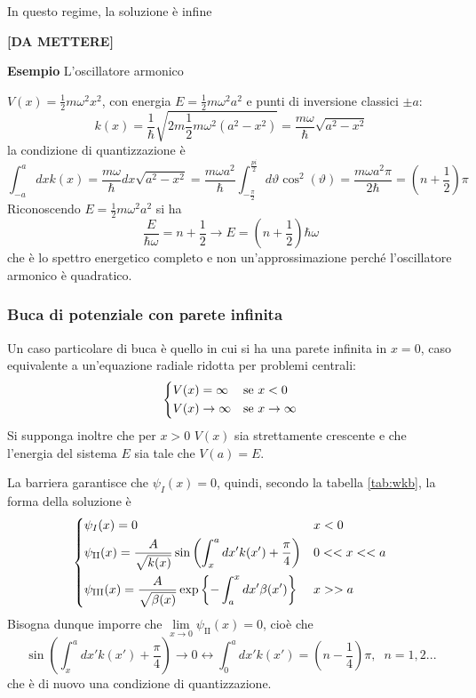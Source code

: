 In questo regime, la soluzione è infine

\begin{center}
{\Large
\textbf{[DA METTERE]}%
}
\end{center}


\textbf{Esempio} L'oscillatore armonico

$V(x)=\frac{1}{2}m\omega^2x^2$, con energia $E=\frac{1}{2}m\omega^2a^2$ e punti di inversione classici
$\pm a$:
$$k(x) = \frac{1}{\hbar}\sqrt{2m\frac{1}{2}m\omega^2(a^2-x^2)} = \frac{m\omega}{\hbar}\sqrt{a^2-x^2}$$
la condizione di quantizzazione è
$$\int_{-a}^{a}dxk(x)=\frac{m\omega}{\hbar}dx\sqrt{a^2-x^2} = \frac{m\omega a^2}{\hbar}
\int_{-\frac{\pi}{2}}^{\frac{pi}{2}}d\vartheta\cos^2(\vartheta) = \frac{m\omega a^2\pi}{2\hbar} =
\left(n+\frac{1}{2}\right)\pi
$$
Riconoscendo $E=\frac{1}{2}m\omega^2a^2$ si ha
$$\frac{E}{\hbar\omega} = n+\frac{1}{2} \rightarrow E = \left(n+\frac{1}{2}\right)\hbar\omega$$
che è lo spettro energetico completo e non un'approssimazione perché l'oscillatore armonico è
quadratico.

\subsubsection{Buca di potenziale con parete infinita}
Un caso particolare di buca è quello in cui si ha una parete infinita in $x=0$, caso equivalente a
un'equazione radiale ridotta per problemi centrali:
$$\begin{dcases}
    V(x)=\infty &\text{se }x<0\\
    V(x)\to\infty&\text{se }x\to\infty
\end{dcases}$$
Si supponga inoltre che per $x>0$ $V(x)$ sia strettamente crescente e che l'energia del sistema $E$ sia tale
che $V(a)=E$.

La barriera garantisce che $\psi_I(x)=0$, quindi, secondo la tabella \ref{tab:wkb}, la forma della
soluzione è
$$\begin{dcases}
    \psi_I(x) = 0 &x<0\\
    \psi_\text{II}(x) = \frac{A}{\sqrt{k(x)}}\sin\left(\int_{x}^{a}dx'k(x')+\frac{\pi}{4}\right) &0<<x<<a\\
    \psi_\text{III}(x) = \frac{A}{\sqrt{\beta(x)}}\exp\left\{-\int_{a}^{x}dx'\beta(x')\right\} &x>>a
\end{dcases}$$
Bisogna dunque imporre che $\lim\limits_{x\to0}\psi_\text{II}(x)=0$, cioè che
$$\sin\left(\int_{x}^{a}dx'k(x')+\frac{\pi}{4}\right)\to0\leftrightarrow\int_{0}^{a}dx'k(x')
=\left(n-\frac{1}{4}\right)\pi,\phantom{x}n=1,2...$$
che è di nuovo una condizione di quantizzazione.
